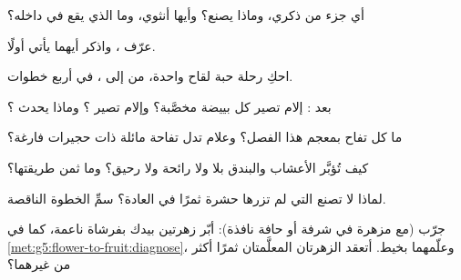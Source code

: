 \begin{exercise}[$\star$]\label{exo:g5:flower-to-fruit:1}
أي جزء من  ذكري، وماذا يصنع؟ وأيها أنثوي، وما الذي يقع في
داخله؟
\end{exercise}

\begin{exercise}[$\star$]\label{exo:g5:flower-to-fruit:2}
عرّف  ، واذكر أيهما يأتي أولًا.
\end{exercise}

\begin{exercise}[$\star$]\label{exo:g5:flower-to-fruit:3}
احكِ رحلة حبة لقاح واحدة، من  إلى ، في أربع خطوات.
\end{exercise}

\begin{exercise}[$\star$]\label{exo:g5:flower-to-fruit:4}
بعد : إلام تصير كل بييضة مخصَّبة؟ وإلام تصير ؟ وماذا
يحدث ؟
\end{exercise}

\begin{exercise}[$\star$]\label{exo:g5:flower-to-fruit:5}
ما كل  تفاح بمعجم هذا الفصل؟ وعلام تدل تفاحة مائلة ذات حجيرات
فارغة؟
\end{exercise}

\begin{exercise}[$\star$]\label{exo:g5:flower-to-fruit:6}
كيف تُؤبَّر الأعشاب والبندق بلا  ولا رائحة ولا رحيق؟ وما ثمن
طريقتها؟
\end{exercise}

\begin{exercise}[$\star$]\label{exo:g5:flower-to-fruit:7}
لماذا لا تصنع  التي لم تزرها حشرة ثمرًا في العادة؟ سمِّ
الخطوة الناقصة.
\end{exercise}

\begin{exercise}[$\star$]\label{exo:g5:flower-to-fruit:8}
جرّب (مع  مزهرة في شرفة أو حافة نافذة): أبّر زهرتين بيدك
بفرشاة ناعمة، كما في \cref{met:g5:flower-to-fruit:diagnose}،
وعلّمهما بخيط. أتعقد الزهرتان المعلَّمتان ثمرًا أكثر من غيرهما؟
\end{exercise}

